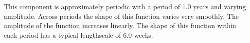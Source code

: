 This component is approximately periodic with a period of 1.0 years and varying amplitude.
Across periods the shape of this function varies very smoothly.
The amplitude of the function increases linearly.
The shape of this function within each period has a typical lengthscale of 6.0 weeks.